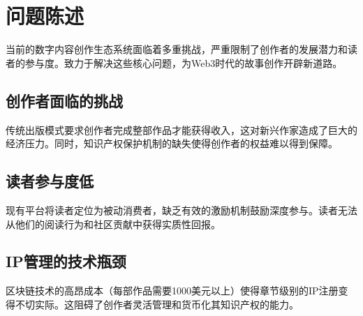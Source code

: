 \section{问题陈述}\label{sec:problem-statement-cn}

当前的数字内容创作生态系统面临着多重挑战，严重限制了创作者的发展潜力和读者的参与度。\storyhouse{}致力于解决这些核心问题，为Web3时代的故事创作开辟新道路。

\subsection{创作者面临的挑战}

传统出版模式要求创作者完成整部作品才能获得收入，这对新兴作家造成了巨大的经济压力。同时，知识产权保护机制的缺失使得创作者的权益难以得到保障。

\subsection{读者参与度低}

现有平台将读者定位为被动消费者，缺乏有效的激励机制鼓励深度参与。读者无法从他们的阅读行为和社区贡献中获得实质性回报。

\subsection{IP管理的技术瓶颈}

区块链技术的高昂成本（每部作品需要1000美元以上）使得章节级别的IP注册变得不切实际。这阻碍了创作者灵活管理和货币化其知识产权的能力。